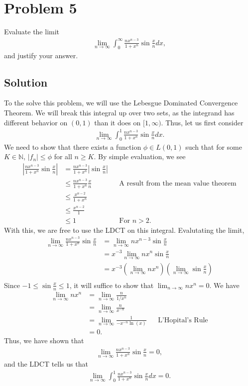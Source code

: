 \documentclass[10pt,a4paper]{article}
\theoremstyle{theorem}
\theoremstyle{definition}
\begin{document}
\section*{Problem 5}
Evaluate the limit
\begin{align*}
\lim_{n \to \infty} \int_0^\infty \frac{n x^{n - 3}}{1 + x^n}\sin \frac{x}{n} dx,
\end{align*}
and justify your answer.

\subsection*{Solution}
To the solve this problem, we will use the Lebesgue Dominated Convergence Theorem. We will break this integral up over two sets, as the integrand has different behavior on $(0, 1)$ than it does on $[1, \infty)$. Thus, let us first consider
\begin{align*}
\lim_{n \to \infty} \int_0^1 \frac{n x^{n - 3}}{1 + x^n}\sin \frac{x}{n} dx.
\end{align*}
We need to show that there exists a function $\phi \in L(0, 1)$ such that for some $K \in \mathbb{N}$,  $|f_n| \leq \phi$ for all $n \geq K$.  By simple evaluation, we see
\begin{align*}
\left|\frac{n x^{n - 3}}{1 + x^n}\sin \frac{x}{n} \right| &= \frac{n x^{n - 3}}{1 + x^n} \left| \sin \frac{x}{n} \right|\\
&\leq \frac{n x^{n - 3}}{1 + x^n} \frac{x}{n} &&\text{A result from the mean value theorem}\\
&\leq  \frac{x^{n - 2}}{1 + x^n}\\
&\leq  \frac{x^{n - 2}}{1}\\
&\leq 1 && \text{For } n > 2.
\end{align*}
With this, we are free to use the LDCT on this integral. Evalutating the limit,
\begin{align*}
\lim_{n \to \infty} \frac{n x^{n - 3}}{1 + x^n}\sin \frac{x}{n} &= \lim_{n \to \infty} n x^{n - 3} \sin \frac{x}{n}\\
&= x^{-3} \lim_{n \to \infty} n x^n \sin \frac{x}{n}\\
&= x^{-3} (\lim_{n \to \infty} n x^n )(\lim_{n \to \infty} \sin \frac{x}{n})\\
\end{align*}
Since $-1 \leq \sin \frac{x}{n} \leq 1$, it will suffice to show that $\lim_{n \to \infty} n x^n = 0$. We have
\begin{align*}
\lim_{n \to \infty} n x^n &= \lim_{n \to \infty} \frac{n}{1/x^n}\\
&= \lim_{n \to \infty} \frac{n}{x^{-n}}\\
&= \lim_{n \to \infty} \frac{1}{-x^{-n} \ln(x)} &&\text{L'Hopital's Rule}\\
&= 0.
\end{align*}
Thus, we have shown that 
\begin{align*}
\lim_{n \to \infty} \frac{n x^{n - 3}}{1 + x^n}\sin \frac{x}{n} = 0,
\end{align*}
and the LDCT tells us that 
\begin{align*}
\lim_{n \to \infty} \int_0^1 \frac{n x^{n - 3}}{1 + x^n}\sin \frac{x}{n} dx = 0.
\end{align*}
\end{document}
